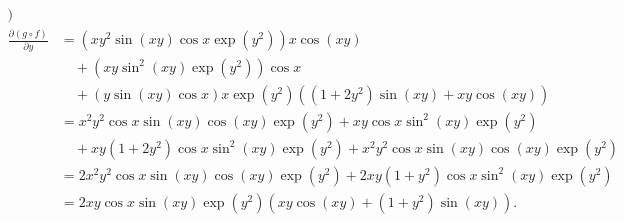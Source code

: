 {\begin{enumerate}
{\begin{align*}
)
\\
\frac{\partial (g\circ f)}{\partial y}
&=
(xy^2 \sin (xy) \cos x \exp(y^2))
x\cos (xy)
\\
&\quad
+
(xy \sin^2 (xy) \exp(y^2))
\cos x
\\
&\quad
+(y \sin (xy) \cos x)
x\exp(y^2)((1+2y^2)\sin(xy) +xy\cos(xy))
\\
&=
x^2y^2  \cos x\sin (xy) 
\cos (xy)\exp(y^2) +xy \cos x\sin^2 (xy) \exp(y^2)
\\
&\quad
+xy(1+2y^2)  \cos x \sin^2 (xy)
\exp(y^2)
+x^2y^2 \cos x\sin (xy)\cos(xy)\exp(y^2)
\\
&=
2 x^2y^2  \cos x\sin (xy) 
\cos (xy)\exp(y^2) +2xy(1+y^2) \cos x\sin^2 (xy) \exp(y^2)
\\
&=
2xy \cos x   \sin (xy)\exp(y^2)
(xy  \cos (xy) +(1+y^2)  \sin (xy) ) .
\end{align*}}
\end{enumerate}
}